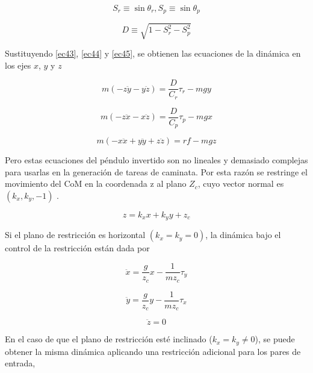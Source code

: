 \begin{equation}
S_r \equiv \sin\theta_r, S_p \equiv \sin\theta_p
\label{ec49}
\end{equation}

\begin{equation}
D \equiv \sqrt{1-S_r^{2}-S_p^{2}}
\label{ec410}
\end{equation}

Sustituyendo \ref{ec43}, \ref{ec44} y \ref{ec45}, se obtienen las ecuaciones de la dinámica en los ejes $x$, $y$ y $z$

\begin{equation}
m\left ( -z\ddot{y} - y\ddot{z} \right ) = \frac{D}{C_r}\tau_r - mgy
\label{ec411} 
\end{equation}

\begin{equation}
m\left ( -z\ddot{x} - x\ddot{z} \right ) = \frac{D}{C_p}\tau_p - mgx
\label{ec412} 
\end{equation}

\begin{equation}
m\left ( -x\ddot{x} + y\ddot{y} + z\ddot{z} \right ) = rf - mgz
\label{ec413} 
\end{equation}

Pero estas ecuaciones del péndulo invertido son no lineales y demasiado complejas para usarlas en la generación de tareas de caminata. Por esta razón se restringe el movimiento del CoM en la coordenada z al plano $Z_c$, cuyo vector normal es $(k_x,k_y,-1)$ \cite{ref38}.

\begin{equation}
z = k_x x + k_y y + z_c
\label{ec414}
\end{equation}

Si el plano de restricción es horizontal $(k_x=k_y=0)$, la dinámica bajo el control de la restricción están dada por

\begin{equation}
\ddot{x}=\frac{g}{z_c}x - \frac{1}{m z_c}\tau_y
\label{ec415}
\end{equation}

\begin{equation}
\ddot{y}=\frac{g}{z_c}y - \frac{1}{m z_c}\tau_x
\label{ec416}
\end{equation}

\begin{equation}
\ddot{z}=0
\label{ec417}
\end{equation}

En el caso de que el plano de restricción esté inclinado ($k_x=k_y\neq0$), se puede obtener la misma dinámica aplicando una restricción adicional para los pares de entrada,

